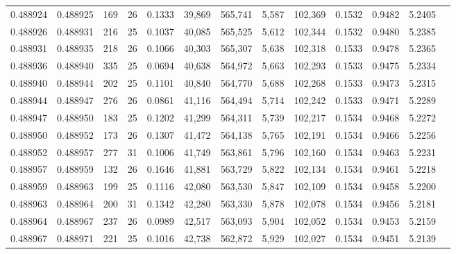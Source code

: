 \begin{tabular}{rrrrrrrrrrrrr}
0.488924 & 0.488925 & 169 &  26 &                                     0.1333 &  39,869 & 565,741 &   5,587 & 102,369 & 0.1532 & 0.9482 & 5.2405 \\
0.488926 & 0.488931 & 216 &  25 &                                     0.1037 &  40,085 & 565,525 &   5,612 & 102,344 & 0.1532 & 0.9480 & 5.2385 \\
0.488931 & 0.488935 & 218 &  26 &                                     0.1066 &  40,303 & 565,307 &   5,638 & 102,318 & 0.1533 & 0.9478 & 5.2365 \\
0.488936 & 0.488940 & 335 &  25 &                                     0.0694 &  40,638 & 564,972 &   5,663 & 102,293 & 0.1533 & 0.9475 & 5.2334 \\
0.488940 & 0.488944 & 202 &  25 &                                     0.1101 &  40,840 & 564,770 &   5,688 & 102,268 & 0.1533 & 0.9473 & 5.2315 \\
0.488944 & 0.488947 & 276 &  26 &                                     0.0861 &  41,116 & 564,494 &   5,714 & 102,242 & 0.1533 & 0.9471 & 5.2289 \\
0.488947 & 0.488950 & 183 &  25 &                                     0.1202 &  41,299 & 564,311 &   5,739 & 102,217 & 0.1534 & 0.9468 & 5.2272 \\
0.488950 & 0.488952 & 173 &  26 &                                     0.1307 &  41,472 & 564,138 &   5,765 & 102,191 & 0.1534 & 0.9466 & 5.2256 \\
0.488952 & 0.488957 & 277 &  31 &                                     0.1006 &  41,749 & 563,861 &   5,796 & 102,160 & 0.1534 & 0.9463 & 5.2231 \\
0.488957 & 0.488959 & 132 &  26 &                                     0.1646 &  41,881 & 563,729 &   5,822 & 102,134 & 0.1534 & 0.9461 & 5.2218 \\
0.488959 & 0.488963 & 199 &  25 &                                     0.1116 &  42,080 & 563,530 &   5,847 & 102,109 & 0.1534 & 0.9458 & 5.2200 \\
0.488963 & 0.488964 & 200 &  31 &                                     0.1342 &  42,280 & 563,330 &   5,878 & 102,078 & 0.1534 & 0.9456 & 5.2181 \\
0.488964 & 0.488967 & 237 &  26 &                                     0.0989 &  42,517 & 563,093 &   5,904 & 102,052 & 0.1534 & 0.9453 & 5.2159 \\
0.488967 & 0.488971 & 221 &  25 &                                     0.1016 &  42,738 & 562,872 &   5,929 & 102,027 & 0.1534 & 0.9451 & 5.2139 \\

\end{tabular}

